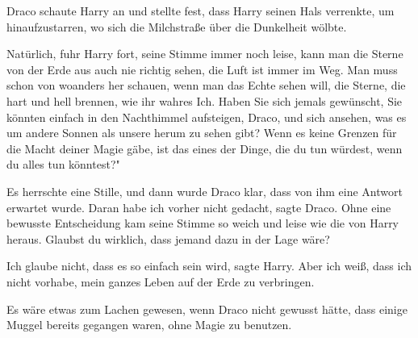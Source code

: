 Draco schaute Harry an und stellte fest, dass Harry seinen Hals verrenkte, um
hinaufzustarren, wo sich die Milchstraße über die Dunkelheit wölbte.

\glqq{}Natürlich\grqq{}, fuhr Harry fort, seine Stimme immer noch leise, \glqq
kann man die Sterne von der Erde aus auch nie richtig sehen, die Luft ist immer
im Weg. Man muss schon von woanders her schauen, wenn man das Echte sehen will,
die Sterne, die hart und hell brennen, wie ihr wahres Ich. Haben Sie sich jemals
gewünscht, Sie könnten einfach in den Nachthimmel aufsteigen, Draco, und sich
ansehen, was es um andere Sonnen als unsere herum zu sehen gibt? Wenn es keine
Grenzen für die Macht deiner Magie gäbe, ist das eines der Dinge, die du tun
würdest, wenn du alles tun könntest?"

Es herrschte eine Stille, und dann wurde Draco klar, dass von ihm eine Antwort
erwartet wurde. \glqq{}Daran habe ich vorher nicht gedacht\grqq{}, sagte Draco.
Ohne eine bewusste Entscheidung kam seine Stimme so weich und leise wie die von
Harry heraus. \glqq{}Glaubst du wirklich, dass jemand dazu in der Lage
wäre?\grqq{}

\glqq{}Ich glaube nicht, dass es so einfach sein wird\grqq{}, sagte Harry. \glqq
Aber ich weiß, dass ich nicht vorhabe, mein ganzes Leben auf der Erde zu
verbringen.\grqq{}

Es wäre etwas zum Lachen gewesen, wenn Draco nicht gewusst hätte, dass einige
Muggel bereits gegangen waren, ohne Magie zu benutzen.

